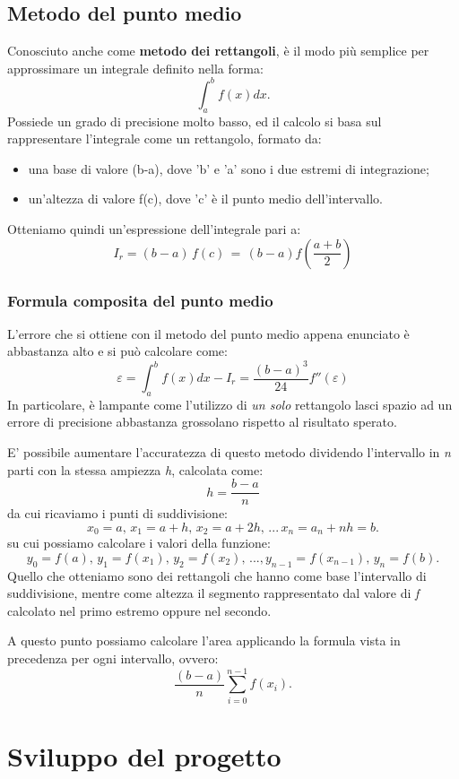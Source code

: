 \documentclass{article}
\begin{document}
\subsection{Metodo del punto medio}
Conosciuto anche come \textbf{metodo dei rettangoli}, è il modo più semplice per approssimare un integrale definito nella forma:
\begin{equation*}
   \int_{a}^{b} f(x) dx.
\end{equation*}
Possiede un grado di precisione molto basso, ed il calcolo si basa sul rappresentare l'integrale come un rettangolo, formato da:
\begin{itemize}
   \item una base di valore (b-a), dove 'b' e 'a' sono i due estremi di integrazione;
   \item un'altezza di valore f(c), dove 'c' è il punto medio dell'intervallo.
\end{itemize}
Otteniamo quindi un'espressione dell'integrale pari a:
\begin{equation*}
   I_{r} = (b-a)\,f(c)\,=\,(b-a)f \left( \frac{a+b}{2}  \right)
\end{equation*}
\subsubsection{Formula composita del punto medio}
L'errore che si ottiene con il metodo del punto medio appena enunciato è abbastanza alto e si può calcolare come:
\begin{equation*}
   \varepsilon = \int_{a}^{b} f(x) dx - I_r = \frac{(b-a)^3}{24}f''(\varepsilon)
\end{equation*}
In particolare, è lampante come l'utilizzo di \textit{un solo} rettangolo lasci spazio ad un errore di precisione abbastanza grossolano rispetto al risultato sperato.

E' possibile aumentare l'accuratezza di questo metodo dividendo l'intervallo in \textit{n} parti con  la stessa ampiezza \textit{h}, calcolata come:
\begin{equation*}
   h = \frac{b-a}{n}
\end{equation*}
da cui ricaviamo i punti di suddivisione:
\begin{equation*}
   x_0 = a,\,x_1 = a+h,\, x_2 = a + 2h,\,...\,x_n = a_n + nh = b.
\end{equation*}
su cui possiamo calcolare i valori della funzione:
\begin{equation*}
   y_0 = f(a),\,y_1 = f(x_1),\,y_2 = f(x_2),\,...,y_{n-1} = f(x_{n-1}),\,y_n = f(b).
\end{equation*}
Quello che otteniamo sono dei rettangoli che hanno come base l'intervallo di suddivisione, mentre come altezza il segmento rappresentato dal valore di \textit{f} calcolato 
nel primo estremo oppure nel secondo.

A questo punto possiamo calcolare l'area applicando la formula vista in precedenza per ogni intervallo, ovvero:
\begin{equation*}
   \frac{(b-a)}{n} \sum_{i=0}^{n-1} f(x_i).
\end{equation*}


\section{Sviluppo del progetto}
\end{document}
